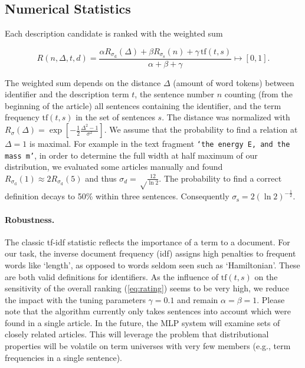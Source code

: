 \documentclass[runningheads]{llncs}
\begin{document}
\subsection{Numerical Statistics}

Each description candidate is ranked with the weighted sum

\begin{equation} \label{eq:rating}
R(n,\Delta,t,d)=\frac{\alpha{R}_{\sigma_\mathrm d}(\Delta)
+\beta{R}_{\sigma_\mathrm s}(n)
+\gamma\,\mathrm{tf}(t,s)}{\alpha+\beta+\gamma} \mapsto [0,1].
\end{equation}

The weighted sum depends on the distance $\Delta$ (amount of word tokens) between
identifier and the description term $t$, the sentence number $n$ counting
(from the beginning of the article) all sentences containing the identifier,
and the term frequency $\mathrm{tf}(t,s)$ in the set of sentences $s$. The
distance was normalized with $R_\sigma(\Delta) = \exp\left[ -\frac{1}{2}
\frac{\Delta^2-1}{\sigma^2}\right].$ We assume that the probability to find a
relation at $\Delta=1$ is maximal. For example in the text fragment
\texttt{`the energy E, and the mass m'}, in order to determine the full width
at half maximum of our distribution, we evaluated some articles manually and
found $R_{\sigma_\mathrm d}(1)\approx 2 R_{\sigma_\mathrm d}(5)$ and thus
$\sigma_d=\sqrt\frac{12}{\ln 2}$. The probability to find a correct definition
decays to 50\% within three sentences. Consequently $\sigma_\mathrm
s=2\left({\ln 2}\right)^{-\frac{1}{2}}$.


\paragraph{Robustness.}

The classic tf-idf \cite{Salton86} statistic reflects the importance of a term
to a document. For our task, the inverse document frequency (idf) assigns
high penalties to frequent words like `length', as opposed to words seldom
seen such as `Hamiltonian'. These are both valid definitions for identifiers.
As the influence of $\mathrm{tf}(t,s)$ on the sensitivity of the overall ranking
(\ref{eq:rating}) seems to be very high, we reduce the impact with the tuning
parameters $\gamma=0.1$ and remain $\alpha = \beta = 1$. Please note that the algorithm
currently only takes sentences into account which were found in a single article.
In the future, the MLP system will examine sets of closely related articles.
This will leverage the problem that distributional properties will be volatile on
term universes with very few members (e.g., term frequencies in a single sentence).
\end{document}
